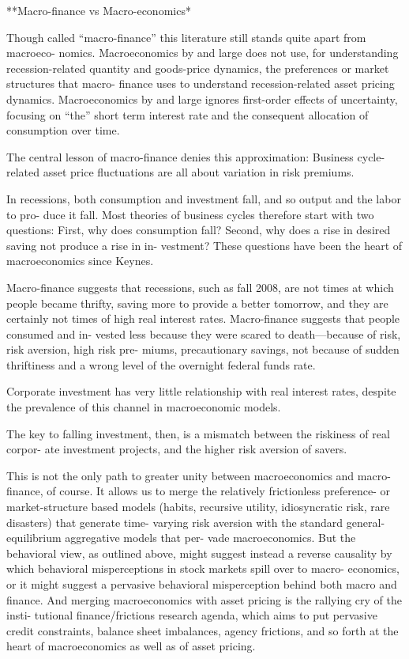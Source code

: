 \documentclass[
]{book}
\begin{document}
**Macro-finance vs Macro-economics*

Though called ``macro-finance'' this literature still stands quite apart from macroeco-
nomics. Macroeconomics by and large does not use, for understanding recession-related
quantity and goods-price dynamics, the preferences or market structures that macro-
finance uses to understand recession-related asset pricing dynamics. Macroeconomics by
and large ignores first-order effects of uncertainty, focusing on ``the'' short term interest
rate and the consequent allocation of consumption over time.

The central lesson of macro-finance denies this approximation: Business cycle-related
asset price fluctuations are all about variation in risk premiums.

In recessions, both consumption and investment fall, and so output and the labor to pro-
duce it fall. Most theories of business cycles therefore start with two questions: First, why
does consumption fall? Second, why does a rise in desired saving not produce a rise in in-
vestment? These questions have been the heart of macroeconomics since Keynes.

Macro-finance suggests that recessions, such as fall 2008, are not times at which
people became thrifty, saving more to provide a better tomorrow, and they are certainly
not times of high real interest rates. Macro-finance suggests that people consumed and in-
vested less because they were scared to death---because of risk, risk aversion, high risk pre-
miums, precautionary savings, not because of sudden thriftiness and a wrong level of the
overnight federal funds rate.

Corporate investment has very little relationship with real interest rates, despite the prevalence of this channel in macroeconomic models.

The key to falling investment, then, is a mismatch between the riskiness of real corpor-
ate investment projects, and the higher risk aversion of savers.

This is not the only path to greater unity between macroeconomics and macro-finance,
of course. It allows us to merge the relatively frictionless preference- or market-structure
based models (habits, recursive utility, idiosyncratic risk, rare disasters) that generate time-
varying risk aversion with the standard general-equilibrium aggregative models that per-
vade macroeconomics. But the behavioral view, as outlined above, might suggest instead a
reverse causality by which behavioral misperceptions in stock markets spill over to macro-
economics, or it might suggest a pervasive behavioral misperception behind both macro
and finance. And merging macroeconomics with asset pricing is the rallying cry of the insti-
tutional finance/frictions research agenda, which aims to put pervasive credit constraints,
balance sheet imbalances, agency frictions, and so forth at the heart of macroeconomics as
well as of asset pricing.
\end{document}
